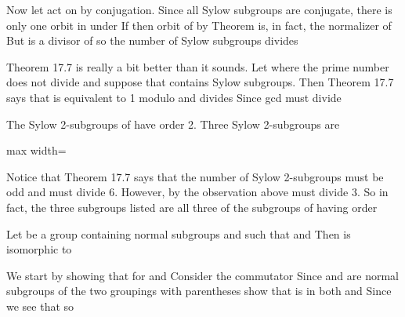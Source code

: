 \documentclass[11pt,oneside]{article}
\begin{document}
\begin{BookBody}

Now let  act on  by conjugation. Since all Sylow subgroups are conjugate, there is only one orbit in  under  If  then orbit of  by Theorem  is, in fact, the normalizer of  But  is a divisor of  so the number of Sylow subgroups divides \BookEnd{\blacklozenge}

Theorem 17.7 is really a bit better than it sounds. Let  where the prime number  does not divide  and suppose that  contains  Sylow subgroups. Then Theorem 17.7 says that  is equivalent to 1 modulo  and  divides  Since gcd must divide 


 The Sylow 2-subgroups of  have order 2. Three Sylow 2-subgroups are

\begin{center}\begin{adjustbox}{max width=\linewidth}\end{adjustbox}\end{center}

\noindent Notice that Theorem 17.7 says that the number  of Sylow 2-subgroups must be odd and  must divide 6. However, by the observation above must divide 3. So in fact, the three subgroups listed are all three of the subgroups of  having order \BookEnd{\blacktriangle}

 Let  be a group containing normal subgroups  and  such that  and  Then  is isomorphic to \BookEnd{\blacklozenge}

 We start by showing that  for  and  Consider the commutator  Since  and  are normal subgroups of  the two groupings with parentheses show that  is in both  and  Since  we see that  so 


\end{BookBody}
\end{document}

